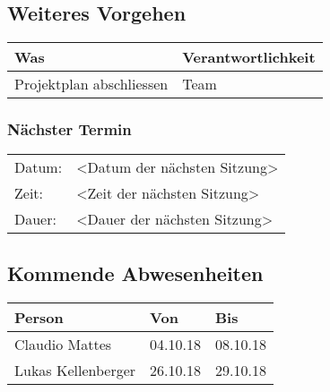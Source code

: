 \vspace{1cm}

\subsection*{Weiteres Vorgehen}
\begin{table}[H]
    \centering
    \begin{tabular}{p{12cm} p{4cm}}
        \textbf{Was} & \textbf{Verantwortlichkeit} \\ \hline
        Projektplan abschliessen & Team \\ \hline
    \end{tabular}
\end{table}

\subsubsection*{Nächster Termin}

\begin{tabular}{p{4cm} p{12cm}}
    Datum: & <Datum der nächsten Sitzung> \\
    Zeit: & <Zeit der nächsten Sitzung> \\
    Dauer: & <Dauer der nächsten Sitzung> \\
\end{tabular}

\vspace{1cm}

\subsection*{Kommende Abwesenheiten}
\begin{table}[H]
    \centering
    \begin{tabular}{p{6cm} p{5cm} p{5cm}}
        \textbf{Person} & \textbf{Von} & \textbf{Bis} \\ \hline
        Claudio Mattes & 04.10.18 & 08.10.18 \\ \hline
        Lukas Kellenberger & 26.10.18 & 29.10.18 \\ \hline
    \end{tabular}
\end{table}

